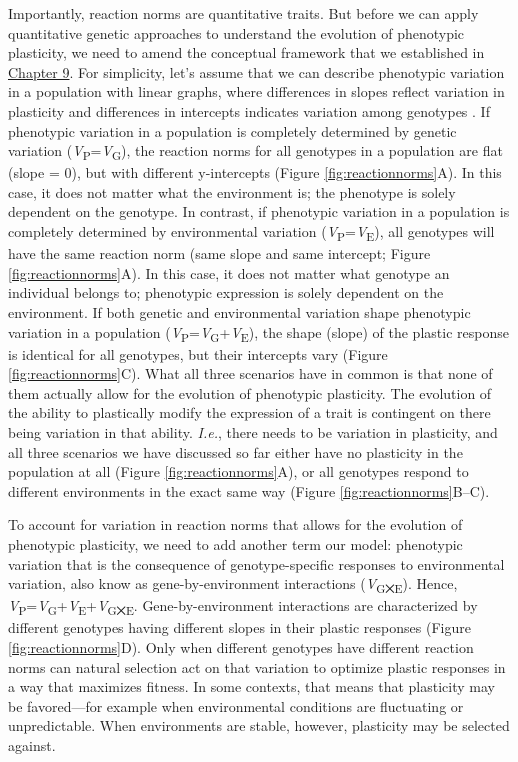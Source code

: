 \documentclass[
]{book}
\begin{document}
Importantly, reaction norms are quantitative traits. But before we can apply quantitative genetic approaches to understand the evolution of phenotypic plasticity, we need to amend the conceptual framework that we established in \href{the-evolution-of-quantitative-traits.html\#quantifying-trait-heritability}{Chapter 9}. For simplicity, let's assume that we can describe phenotypic variation in a population with linear graphs, where differences in slopes reflect variation in plasticity and differences in intercepts indicates variation among genotypes . If phenotypic variation in a population is completely determined by genetic variation (\emph{V}\textsubscript{P}=\emph{V}\textsubscript{G}), the reaction norms for all genotypes in a population are flat (slope = 0), but with different y-intercepts (Figure \ref{fig:reactionnorms}A). In this case, it does not matter what the environment is; the phenotype is solely dependent on the genotype. In contrast, if phenotypic variation in a population is completely determined by environmental variation (\emph{V}\textsubscript{P}=\emph{V}\textsubscript{E}), all genotypes will have the same reaction norm (same slope and same intercept; Figure \ref{fig:reactionnorms}A). In this case, it does not matter what genotype an individual belongs to; phenotypic expression is solely dependent on the environment. If both genetic and environmental variation shape phenotypic variation in a population (\emph{V}\textsubscript{P}=\emph{V}\textsubscript{G}+\emph{V}\textsubscript{E}), the shape (slope) of the plastic response is identical for all genotypes, but their intercepts vary (Figure \ref{fig:reactionnorms}C). What all three scenarios have in common is that none of them actually allow for the evolution of phenotypic plasticity. The evolution of the ability to plastically modify the expression of a trait is contingent on there being variation in that ability. \emph{I.e.}, there needs to be variation in plasticity, and all three scenarios we have discussed so far either have no plasticity in the population at all (Figure \ref{fig:reactionnorms}A), or all genotypes respond to different environments in the exact same way (Figure \ref{fig:reactionnorms}B--C).

To account for variation in reaction norms that allows for the evolution of phenotypic plasticity, we need to add another term our model: phenotypic variation that is the consequence of genotype-specific responses to environmental variation, also know as gene-by-environment interactions (\emph{V}\textsubscript{G⨉E}). Hence, \emph{V}\textsubscript{P}=\emph{V}\textsubscript{G}+\emph{V}\textsubscript{E}+\emph{V}\textsubscript{G⨉E}. Gene-by-environment interactions are characterized by different genotypes having different slopes in their plastic responses (Figure \ref{fig:reactionnorms}D). Only when different genotypes have different reaction norms can natural selection act on that variation to optimize plastic responses in a way that maximizes fitness. In some contexts, that means that plasticity may be favored---for example when environmental conditions are fluctuating or unpredictable. When environments are stable, however, plasticity may be selected against.
\end{document}

